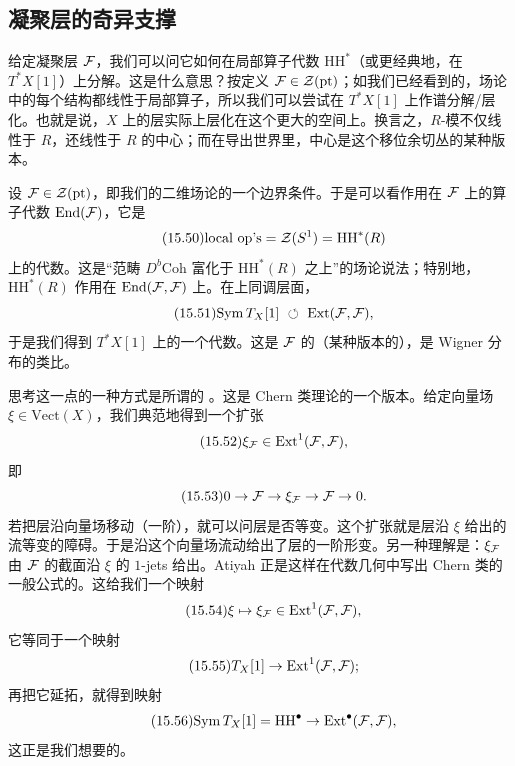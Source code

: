 \subsection{凝聚层的奇异支撑}

给定凝聚层 $\mathcal{F}$，我们可以问它如何在局部算子代数 $\mathrm{HH}^*$（或更经典地，在 $T^*X[1]$）上分解。这是什么意思？按定义 $\mathcal{F}\in\mathcal{Z}(\mathrm{pt})$；如我们已经看到的，场论中的每个结构都线性于局部算子，所以我们可以尝试在 $T^*X[1]$ 上作谱分解/层化。也就是说，$X$ 上的层实际上层化在这个更大的空间上。换言之，$R$-模不仅线性于 $R$，还线性于 $R$ 的中心；而在导出世界里，中心是这个移位余切丛的某种版本。

设 $\mathcal{F}\in\mathcal{Z}(\mathrm{pt})$，即我们的二维场论的一个边界条件。于是可以看作用在 $\mathcal{F}$ 上的算子代数 $\mathrm{End}(\mathcal{F})$，它是
\begin{equation}\tag{15.50}
\text{local op's}=\mathcal{Z}(S^1)=\mathrm{HH}^*(R)
\end{equation}
上的代数。这是“范畴 $D^b\mathrm{Coh}$ 富化于 $\mathrm{HH}^*(R)$ 之上”的场论说法；特别地，$\mathrm{HH}^*(R)$ 作用在 $\mathrm{End}(\mathcal{F},\mathcal{F})$ 上。在上同调层面，
\begin{equation}\tag{15.51}
\mathrm{Sym}\,T_X[1]\ \circlearrowleft\ \mathrm{Ext}(\mathcal{F},\mathcal{F}),
\end{equation}
于是我们得到 $T^*X[1]$ 上的一个代数。这是 $\mathcal{F}$ 的（某种版本的），是 Wigner 分布的类比。

思考这一点的一种方式是所谓的 。这是 Chern 类理论的一个版本。给定向量场 $\xi\in\mathrm{Vect}(X)$，我们典范地得到一个扩张
\begin{equation}\tag{15.52}
\xi_{\mathcal{F}}\in\mathrm{Ext}^1(\mathcal{F},\mathcal{F}),
\end{equation}
即
\begin{equation}\tag{15.53}
0\to\mathcal{F}\to\xi_{\mathcal{F}}\to\mathcal{F}\to0.
\end{equation}
若把层沿向量场移动（一阶），就可以问层是否等变。这个扩张就是层沿 $\xi$ 给出的流等变的障碍。于是沿这个向量场流动给出了层的一阶形变。另一种理解是：$\xi_{\mathcal{F}}$ 由 $\mathcal{F}$ 的截面沿 $\xi$ 的 $1$-jets 给出。Atiyah 正是这样在代数几何中写出 Chern 类的一般公式的。这给我们一个映射
\begin{equation}\tag{15.54}
\xi\mapsto\xi_{\mathcal{F}}\in\mathrm{Ext}^1(\mathcal{F},\mathcal{F}),
\end{equation}
它等同于一个映射
\begin{equation}\tag{15.55}
T_X[1]\to\mathrm{Ext}^1(\mathcal{F},\mathcal{F});
\end{equation}
再把它延拓，就得到映射
\begin{equation}\tag{15.56}
\mathrm{Sym}\,T_X[1]=\mathrm{HH}^\bullet\to\mathrm{Ext}^\bullet(\mathcal{F},\mathcal{F}),
\end{equation}
这正是我们想要的。

